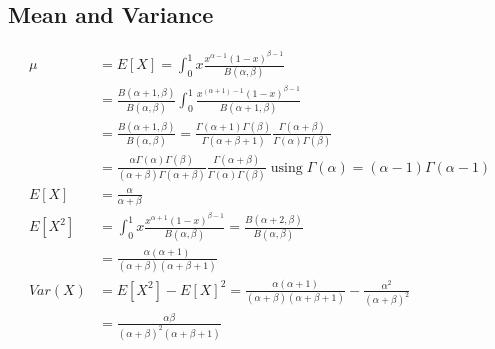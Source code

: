 \documentclass[../../probability-notes.tex]{subfiles}
\begin{document}
    \subsection{Mean and Variance}
    \begin{align*}
        \mu &= E[X] = \int_{0}^{1} x \frac{x^{\alpha - 1}(1-x)^{\beta - 1}}{B(\alpha, \beta)}\\
        &= \frac{B(\alpha+1, \beta)}{B(\alpha, \beta)} \int_{0}^{1} \frac{x^{(\alpha + 1)-1}(1-x)^{\beta - 1}}{B(\alpha+1, \beta)}\\
        &= \frac{B(\alpha+1, \beta)}{B(\alpha, \beta)} = \frac{\Gamma(\alpha+1)\Gamma(\beta)}{\Gamma(\alpha+\beta+1)} \frac{\Gamma(\alpha+\beta)}{\Gamma(\alpha)\Gamma(\beta)}\\
        &= \frac{\alpha \Gamma(\alpha) \Gamma(\beta)}{(\alpha+\beta)\Gamma(\alpha+\beta)}  \frac{\Gamma(\alpha+\beta)}{\Gamma(\alpha)\Gamma(\beta)} \; \text{using}\; \Gamma(\alpha)=(\alpha - 1) \Gamma (\alpha - 1)\\
        E[X] &= \frac{\alpha}{\alpha + \beta}\\
        E[X^{2}] &= \int_{0}^{1} x \frac{x^{\alpha + 1}(1-x)^{\beta - 1}}{B(\alpha, \beta)} = \frac{B(\alpha + 2, \beta)}{B(\alpha, \beta)}\\
        &= \frac{\alpha(\alpha + 1)}{(\alpha + \beta)(\alpha + \beta + 1)}\\
        Var(X) &= E[X^{2}] - E[X]^{2} = \frac{\alpha(\alpha + 1)}{(\alpha + \beta)(\alpha + \beta + 1)} - \frac{\alpha^{2}}{(\alpha + \beta)^{2}}\\
        &= \frac{\alpha \beta}{(\alpha + \beta)^{2}(\alpha + \beta + 1)}
    \end{align*}
\end{document}
